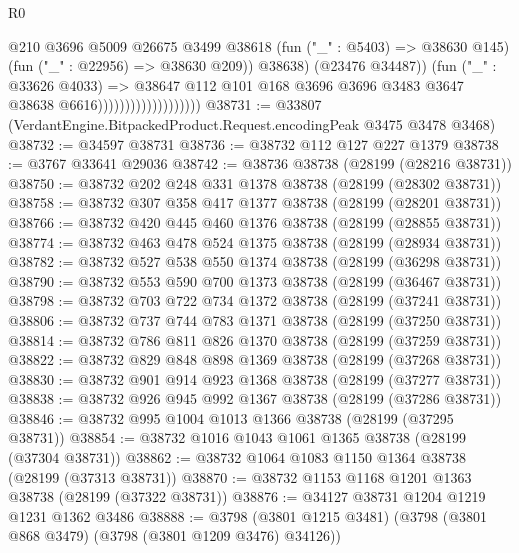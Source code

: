 \begin{lexlean}{R0}
\begin{coremodule}
                                              @210
                                              @3696
                                              @5009
                                              @26675
                                              @3499
                                              @38618
                                              (fun ("_" : @5403) => @38630 @145)
                                              (fun ("_" : @22956) => @38630 @209))
                                            @38638)
                                          (@23476 @34487))
                                        (fun ("_" : @33626 @4033) =>
                                        @38647
                                          @112
                                          @101
                                          @168
                                          @3696
                                          @3696
                                          @3483
                                          @3647
                                          @38638
                                          @6616)))))))))))))))))))
@38731 := @33807 (VerdantEngine.BitpackedProduct.Request.encodingPeak @3475 @3478 @3468)
@38732 := @34597 @38731
@38736 := @38732 @112 @127 @227 @1379
@38738 := @3767 @33641 @29036
@38742 := @38736 @38738 (@28199 (@28216 @38731))
@38750 := @38732 @202 @248 @331 @1378 @38738 (@28199 (@28302 @38731))
@38758 := @38732 @307 @358 @417 @1377 @38738 (@28199 (@28201 @38731))
@38766 := @38732 @420 @445 @460 @1376 @38738 (@28199 (@28855 @38731))
@38774 := @38732 @463 @478 @524 @1375 @38738 (@28199 (@28934 @38731))
@38782 := @38732 @527 @538 @550 @1374 @38738 (@28199 (@36298 @38731))
@38790 := @38732 @553 @590 @700 @1373 @38738 (@28199 (@36467 @38731))
@38798 := @38732 @703 @722 @734 @1372 @38738 (@28199 (@37241 @38731))
@38806 := @38732 @737 @744 @783 @1371 @38738 (@28199 (@37250 @38731))
@38814 := @38732 @786 @811 @826 @1370 @38738 (@28199 (@37259 @38731))
@38822 := @38732 @829 @848 @898 @1369 @38738 (@28199 (@37268 @38731))
@38830 := @38732 @901 @914 @923 @1368 @38738 (@28199 (@37277 @38731))
@38838 := @38732 @926 @945 @992 @1367 @38738 (@28199 (@37286 @38731))
@38846 := @38732 @995 @1004 @1013 @1366 @38738 (@28199 (@37295 @38731))
@38854 := @38732 @1016 @1043 @1061 @1365 @38738 (@28199 (@37304 @38731))
@38862 := @38732 @1064 @1083 @1150 @1364 @38738 (@28199 (@37313 @38731))
@38870 := @38732 @1153 @1168 @1201 @1363 @38738 (@28199 (@37322 @38731))
@38876 := @34127 @38731 @1204 @1219 @1231 @1362 @3486
@38888 := @3798 (@3801 @1215 @3481) (@3798 (@3801 @868 @3479) (@3798 (@3801 @1209 @3476) @34126))

\end{coremodule}
\end{lexlean}
